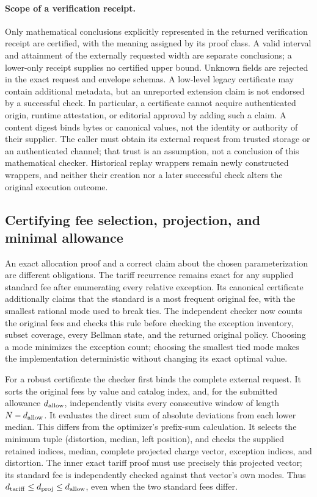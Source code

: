 \documentclass[11pt,letterpaper]{article}
\theoremstyle{definition}\newtheorem{remark}[theorem]{Remark}
\begin{document}
\paragraph{Scope of a verification receipt.}\label{sec:receipt66}
Only mathematical conclusions explicitly represented in the returned verification receipt are certified, with the meaning assigned by its proof class. A valid interval and attainment of the externally requested width are separate conclusions; a lower-only receipt supplies no certified upper bound. Unknown fields are rejected in the exact request and envelope schemas. A low-level legacy certificate may contain additional metadata, but an unreported extension claim is not endorsed by a successful check. In particular, a certificate cannot acquire authenticated origin, runtime attestation, or editorial approval by adding such a claim. A content digest binds bytes or canonical values, not the identity or authority of their supplier. The caller must obtain its external request from trusted storage or an authenticated channel; that trust is an assumption, not a conclusion of this mathematical checker. Historical replay wrappers remain newly constructed wrappers, and neither their creation nor a later successful check alters the original execution outcome.

\subsection{Certifying fee selection, projection, and minimal allowance}\label{sec:semantic64}
An exact allocation proof and a correct claim about the chosen parameterization are different obligations. The tariff recurrence remains exact for any supplied standard fee after enumerating every relative exception. Its canonical certificate additionally claims that the standard is a most frequent original fee, with the smallest rational mode used to break ties. The independent checker now counts the original fees and checks this rule before checking the exception inventory, subset coverage, every Bellman state, and the returned original policy. Choosing a mode minimizes the exception count; choosing the smallest tied mode makes the implementation deterministic without changing its exact optimal value.

For a robust certificate the checker first binds the complete external request. It sorts the original fees by value and catalog index, and, for the submitted allowance $d_{\rm allow}$, independently visits every consecutive window of length $N-d_{\rm allow}$. It evaluates the direct sum of absolute deviations from each lower median. This differs from the optimizer's prefix-sum calculation. It selects the minimum tuple (distortion, median, left position), and checks the supplied retained indices, median, complete projected charge vector, exception indices, and distortion. The inner exact tariff proof must use precisely this projected vector; its standard fee is independently checked against that vector's own modes. Thus $d_{\rm tariff}\leq d_{\rm proj}\leq d_{\rm allow}$, even when the two standard fees differ.
\end{document}
